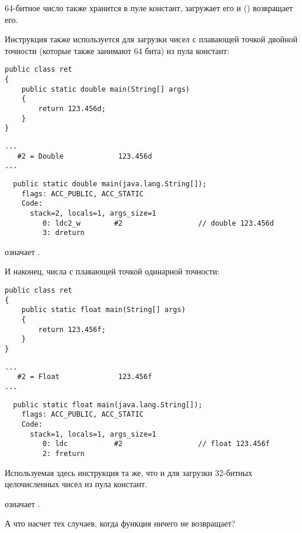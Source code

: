 64-битное число также хранится в пуле констант,  загружает его и  
() возвращает его.

Инструкция  также используется для загрузки чисел с плавающей точкой двойной 
точности (которые также занимают 64 бита) из пула констант:

\begin{lstlisting}[style=customjava]
public class ret
{
	public static double main(String[] args)
	{
		return 123.456d;
	}
}
\end{lstlisting}

\begin{lstlisting}[caption=Constant pool]
...
   #2 = Double             123.456d
...
\end{lstlisting}

\begin{lstlisting}
  public static double main(java.lang.String[]);
    flags: ACC_PUBLIC, ACC_STATIC
    Code:
      stack=2, locals=1, args_size=1
         0: ldc2_w        #2                  // double 123.456d
         3: dreturn       
\end{lstlisting}

 означает .

И наконец, числа с плавающей точкой одинарной точности:

\begin{lstlisting}[style=customjava]
public class ret
{
	public static float main(String[] args)
	{
		return 123.456f;
	}
}
\end{lstlisting}

\begin{lstlisting}[caption=Constant pool]
...
   #2 = Float              123.456f
...
\end{lstlisting}

\begin{lstlisting}
  public static float main(java.lang.String[]);
    flags: ACC_PUBLIC, ACC_STATIC
    Code:
      stack=1, locals=1, args_size=1
         0: ldc           #2                  // float 123.456f
         2: freturn       
\end{lstlisting}

Используемая здесь инструкция  та же, что и для загрузки 32-битных целочисленных чисел
из пула констант.

 означает .

А что насчет тех случаев, когда функция ничего не возвращает?

